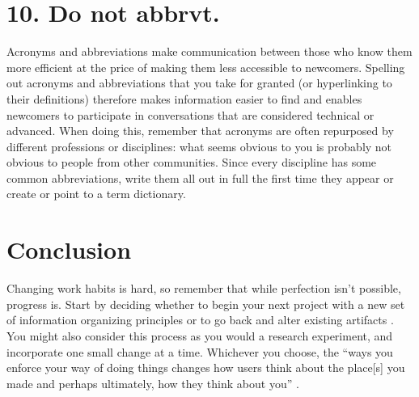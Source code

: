\documentclass[10pt,letterpaper]{article}
\newcommand{\rulemajor}[1]{\section*{#1}}
\begin{document}
\rulemajor{10. Do not abbrvt.}

Acronyms and abbreviations make communication between those who know them more
efficient at the price of making them less accessible to newcomers. Spelling
out acronyms and abbreviations that you take for granted (or hyperlinking to
their definitions) therefore makes information easier to find and enables newcomers
to participate in conversations that are considered technical or advanced. When 
doing this, remember that acronyms are often repurposed by
different professions or disciplines: what seems obvious to you is probably not
obvious to people from other communities. Since every discipline has some common
abbreviations, write them all out in full the first time they appear or create
or point to a term dictionary.

\section*{Conclusion}

Changing work habits is hard, so remember that while perfection isn't possible,
progress is. Start by deciding whether to begin your next project with a new set
of information organizing principles or to go back and alter existing artifacts
\cite{Briney2015}. You might also consider this process as you would a research 
experiment, and incorporate one small change at a time. Whichever you choose, the
``ways you enforce your way of doing things changes how users think about the 
place[s] you made and perhaps ultimately, how they think about you'' \cite{Covert2014}.


\end{document}
